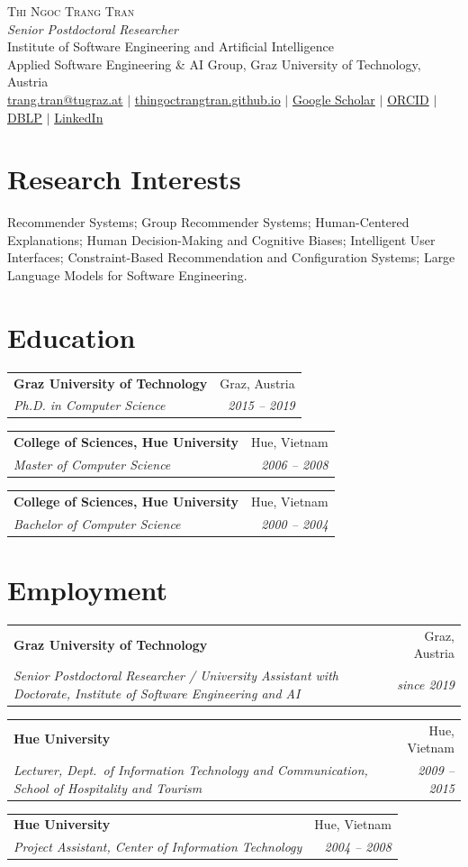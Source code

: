 \documentclass[11pt,a4paper]{article}
\makeatletter
\newcommand{\entry}[4]{%
  \begin{tabularx}{\linewidth}{@{}X r@{}}
    \textbf{#1} & #2 \\
    \textit{#3} & \textit{#4} \\
  \end{tabularx}\vspace{0.4ex}\par}
\makeatother
\begin{document}
\begin{center}
  {\Huge\scshape Thi Ngoc Trang Tran}\\[0.6ex]
  {\itshape Senior Postdoctoral Researcher}\\
  Institute of Software Engineering and Artificial Intelligence\\
  Applied Software Engineering \& AI Group, Graz University of Technology, Austria\\[0.5ex]
  \href{mailto:trang.tran@tugraz.at}{trang.tran@tugraz.at} $\vert$
  \href{https://thingoctrangtran.github.io}{thingoctrangtran.github.io} $\vert$
  \href{https://scholar.google.com/citations?user=N53Bxl0AAAAJ&hl=en}{Google Scholar} $\vert$
  \href{https://orcid.org/0000-0002-3550-8352}{ORCID} $\vert$
  \href{https://dblp.org/pid/201/1870.html}{DBLP} $\vert$
  \href{https://www.linkedin.com/in/trang-tran-b98322b4/}{LinkedIn}
\end{center}

\section{Research Interests}
Recommender Systems; Group Recommender Systems; Human-Centered Explanations;
Human Decision-Making and Cognitive Biases; Intelligent User Interfaces;
Constraint-Based Recommendation and Configuration Systems; Large Language Models
for Software Engineering.

\section{Education}
\entry{Graz University of Technology}{Graz, Austria}
      {Ph.D. in Computer Science}{2015 -- 2019}
\entry{College of Sciences, Hue University}{Hue, Vietnam}
      {Master of Computer Science}{2006 -- 2008}
\entry{College of Sciences, Hue University}{Hue, Vietnam}
      {Bachelor of Computer Science}{2000 -- 2004}

\section{Employment}
\entry{Graz University of Technology}{Graz, Austria}
      {Senior Postdoctoral Researcher / University Assistant with Doctorate,
       Institute of Software Engineering and AI}{since 2019}
\entry{Hue University}{Hue, Vietnam}
      {Lecturer, Dept.\ of Information Technology and Communication,
       School of Hospitality and Tourism}{2009 -- 2015}
\entry{Hue University}{Hue, Vietnam}
      {Project Assistant, Center of Information Technology}{2004 -- 2008}
\end{document}
